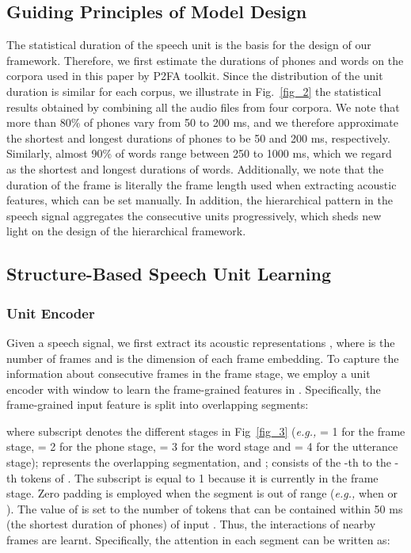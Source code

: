 \documentclass[lettersize,journal]{IEEEtran}
\begin{document}
\subsection{Guiding Principles of Model Design}
\label{statistics}
The statistical duration of the speech unit is the basis for the design of our framework.
Therefore, we first estimate the durations of phones and words on the corpora used in this paper by P2FA \cite{P2FA} toolkit. Since the distribution of the unit duration is similar for each corpus, we illustrate in Fig.~\ref{fig_2} the statistical results obtained by combining all the audio files from four corpora. We note that more than 80\% of phones vary from 50 to 200 ms, and we therefore approximate the shortest and longest durations of phones to be 50 and 200 ms, respectively. Similarly, almost 90\% of words range between 250 to 1000 ms, which we regard as the shortest and longest durations of words. Additionally, we note that the duration of the frame is literally the frame length used when extracting acoustic features, which can be set manually. In addition, the hierarchical pattern in the speech signal aggregates the consecutive units progressively, which sheds new light on the design of the hierarchical framework.

\subsection{Structure-Based Speech Unit Learning}

\subsubsection{Unit Encoder}

Given a speech signal, we first extract its acoustic representations , where  is the number of frames and  is the dimension of each frame embedding. To capture the information about consecutive frames in the frame stage, we employ a unit encoder with window  to learn the frame-grained features in . Specifically, the frame-grained input feature  is split into  overlapping segments:

where subscript  denotes the different stages in Fig~\ref{fig_3} (\textit{e.g.,}  = 1 for the frame stage,  = 2 for the phone stage,  = 3 for the word stage and  = 4 for the utterance stage);
 represents the overlapping segmentation, and ;  consists of the -th to the -th tokens of . The subscript  is equal to 1 because it is currently in the frame stage. Zero padding is employed when the segment is out of range (\textit{e.g.,} when  or ). The value of  is set to the number of tokens that can be contained within 50 ms (the shortest duration of phones) of input . Thus, the interactions of nearby frames are learnt. Specifically, the attention in each segment can be written as:
\end{document}
